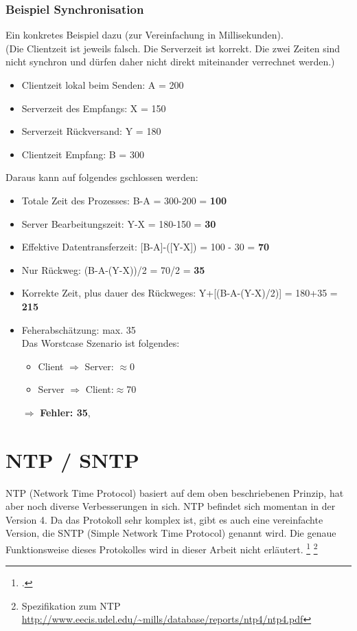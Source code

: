 \subsubsection{Beispiel Synchronisation}
Ein konkretes Beispiel dazu (zur Vereinfachung in Millisekunden).\\
\vspace{0em}
(Die Clientzeit ist jeweils falsch. Die Serverzeit ist korrekt. Die zwei Zeiten sind nicht synchron und dürfen daher nicht direkt miteinander verrechnet werden.)
\begin{itemize}
\item Clientzeit lokal beim Senden: A = 200
\item Serverzeit des Empfangs: X = 150
\item Serverzeit Rückversand: Y = 180
\item Clientzeit Empfang: B = 300
\end{itemize}

Daraus kann auf folgendes gschlossen werden:
\begin{itemize}
\item Totale Zeit des Prozesses: B-A = 300-200 = \textbf{100}
\item Server Bearbeitungszeit: Y-X = 180-150 = \textbf{30}
\item Effektive Datentransferzeit: [B-A]-([Y-X]) = 100 - 30 = \textbf{70}
\item Nur Rückweg: (B-A-(Y-X))/2 = 70/2 = \textbf{35}
\item Korrekte Zeit, plus dauer des Rückweges: Y+[(B-A-(Y-X)/2)] = 180+35 = \textbf{215}
\item Feherabschätzung: max. 35\\
Das Worstcase Szenario ist folgendes:\\
\begin{itemize}
\item Client $\Rightarrow$ Server: $\approx$0
\item Server $\Rightarrow$ Client:$ \approx$70
\end{itemize}
$\Rightarrow$ \textbf{Fehler: 35},
\end{itemize}

\section{NTP / SNTP}
NTP (Network Time Protocol) basiert auf dem oben beschriebenen Prinzip, hat aber noch diverse Verbesserungen in sich.
NTP befindet sich momentan in der Version 4.
Da das Protokoll sehr komplex ist, gibt es auch eine vereinfachte Version, die SNTP (Simple Network Time Protocol) genannt wird.
Die genaue Funktionsweise dieses Protokolles wird in dieser Arbeit nicht erläutert. \footcite{rubTimesync} \footnote{Spezifikation zum NTP \url{http://www.eecis.udel.edu/~mills/database/reports/ntp4/ntp4.pdf}}

